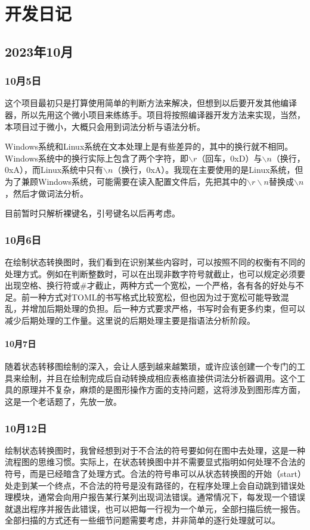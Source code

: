 \appendix


\chapter{开发日记}


\section{2023年10月}


\subsection{10月5日}
这个项目最初只是打算使用简单的判断方法来解决，但想到以后要开发其他编译器，所以先用这个微小项目来练练手。项目将按照编译器开发方法来实现，当然，本项目过于微小，大概只会用到词法分析与语法分析。

Windows系统和Linux系统在文本处理上是有些差异的，其中的换行就不相同。Windows系统中的换行实际上包含了两个字符，即$\backslash r$（回车，0xD）与$\backslash n$（换行，0xA），而Linux系统中只有$\backslash n$（换行，0xA）。我现在主要使用的是Linux系统，但为了兼顾Windows系统，可能需要在读入配置文件后，先把其中的$\backslash r\backslash n$替换成$\backslash n$，然后才做词法分析。

目前暂时只解析裸键名，引号键名以后再考虑。


\subsection{10月6日}
在绘制状态转换图时，我们看到在识别某些内容时，可以按照不同的权衡有不同的处理方式。例如在判断整数时，可以在出现非数字符号就截止，也可以规定必须要出现空格、换行符或\#才截止，两种方式一个宽松，一个严格，各有各的好处与不足。前一种方式对TOML的书写格式比较宽松，但也因为过于宽松可能导致混乱，并增加后期处理的负担。后一种方式要求严格，书写时会有更多约束，但可以减少后期处理的工作量。这里说的后期处理主要是指语法分析阶段。


\subsubsection{10月7日}
随着状态转移图绘制的深入，会让人感到越来越繁琐，或许应该创建一个专门的工具来绘制，并且在绘制完成后自动转换成相应表格直接供词法分析器调用。这个工具的原理并不复杂，麻烦的是图形操作方面的支持问题，这将涉及到图形库方面，这是一个老话题了，先放一放。


\subsection{10月12日}
绘制状态转换图时，我曾经想到对于不合法的符号要如何在图中去处理，这是一种流程图的思维习惯。实际上，在状态转换图中并不需要显式指明如何处理不合法的符号，而是已经暗含了处理方式。合法的符号串可以从状态转换图的开始（start）处走到某一个终点，不合法的符号是没有路径的，在程序处理上会自动跳到错误处理模块，通常会向用户报告某行某列出现词法错误。通常情况下，每发现一个错误就退出程序并报告此错误，也可以把每一行视为一个单元，全部扫描后统一报告。全部扫描的方式还有一些细节问题需要考虑，并非简单的逐行处理就可以。

